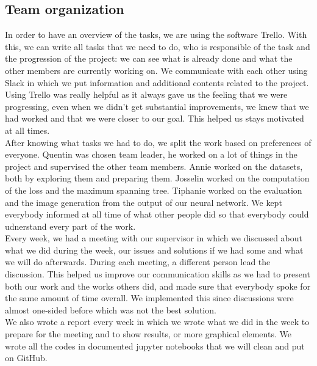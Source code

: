 \subsection{Team organization}

In order to have an overview of the tasks, we are using the software Trello.
With this, we can write all tasks that we need to do, who is responsible of
the task and the progression of the project: we can see what is already done
and what the other members are currently working on. We communicate with each
other using Slack in which we put information and additional contents related
to the project. \\
Using Trello was really helpful as it always gave us the feeling that we were
progressing, even when we didn't get substantial improvements, we knew that we
had worked and that we were closer to our goal. This helped us stays motivated
at all times.\\

After knowing what tasks we had to do, we split the work based on preferences of
everyone. Quentin was chosen team leader, he worked on a lot of things in the
project and supervised the other team members. Annie worked on the datasets,
both by exploring them and preparing them.
Josselin worked on the computation of the loss and the maximum spanning tree.
Tiphanie worked on the evaluation and the image generation from the output of
our neural network.
We kept everybody informed at all time of what other people did so that
everybody could udnerstand every part of the work.\\

Every week, we had a meeting with our supervisor in which we discussed about
what we did during the week, our issues and solutions if we had some and what
we will do afterwards. During each meeting, a different person lead the
discussion.  This helped us improve our communication skills as we had to
present both our work and the works others did, and made sure that everybody
spoke for the same amount of time overall. We implemented this since
discussions were almost one-sided before which was not the best solution.\\

We also wrote a report every week in which we wrote what we did in
the week to prepare for the meeting and to show results, or more graphical
elements. We wrote all the codes in documented jupyter notebooks that we will clean and put on GitHub. \\

